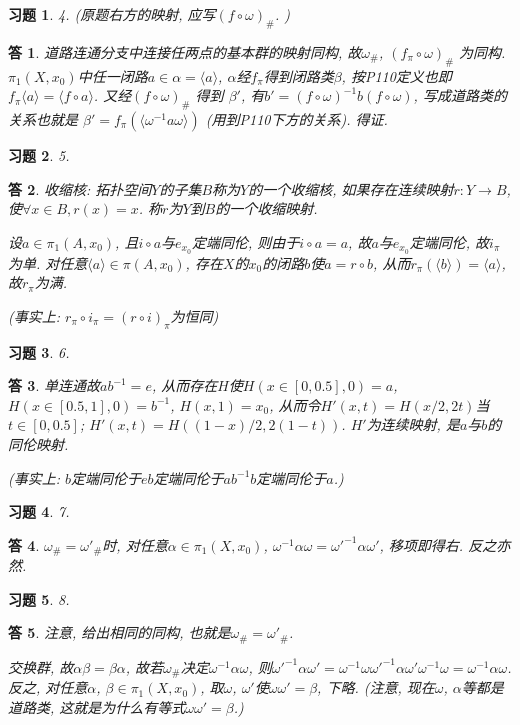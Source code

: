 \documentclass{ctexart}%
\newtheorem*{exercise}{习题}
\newtheorem*{solution}{答}
\theoremstyle{definition}
\theoremstyle{remark}
\begin{document}
\begin{exercise}4. (原题右方的映射, 应写$(f\circ \omega)_\#$. )
\end{exercise}
\begin{solution}
道路连通分支中连接任两点的基本群的映射同构, 故$\omega_\#$, $(f_\pi \circ \omega)_\#$ 为同构. $\pi_1(X,x_0)$中任一闭路$a\in \alpha=\langle a\rangle$, $\alpha$经$f_\pi$得到闭路类$\beta$, 按P110定义也即 $f_\pi\langle a\rangle = \langle f\circ a\rangle$. 又经$(f \circ \omega)_\#$ 得到 $\beta'$, 有$b'= (f \circ \omega)^{-1}b(f \circ \omega)$, 写成道路类的关系也就是
$\beta'=f_\pi(\langle \omega^{-1} a \omega\rangle )$ (用到P110下方的关系). 得证.
\end{solution}

\begin{exercise}5.
\end{exercise}
\begin{solution}
收缩核: 拓扑空间$Y$的子集$B$称为$Y$的一个收缩核, 如果存在连续映射$r:Y\rightarrow B$, 使$\forall x\in B, r(x)=x$. 称$r$为$Y$到$B$的一个收缩映射.

设$a\in \pi_1(A,x_0)$, 且$i\circ a$与$e_{x_0}$定端同伦, 则由于$i\circ a=a$, 故$a$与$e_{x_0}$定端同伦, 故$i_\pi$为单. 对任意$\langle a\rangle \in \pi (A,x_0)$, 存在$X$的$x_0$的闭路$b$使$a=r\circ b$, 从而$r_\pi(\langle b\rangle) = \langle a\rangle$, 故$r_\pi$为满.

(事实上: $r_\pi\circ i_\pi=(r\circ i)_\pi$为恒同)
\end{solution}

\begin{exercise}6.
\end{exercise}
\begin{solution}
单连通故$ab^{-1}=e$, 从而存在$H$使$H(x\in[0,0.5],0)=a$, $H(x\in [0.5,1],0)=b^{-1}$, $H(x,1)=x_0$, 从而令$H'(x,t)=H(x/2,2t)$当$t\in [0,0.5]$; $H'(x,t)=H((1-x)/2, 2(1-t))$. $H'$为连续映射, 是$a$与$b$的同伦映射.

(事实上: $b$定端同伦于$eb$定端同伦于$ab^{-1}b$定端同伦于$a$.)
\end{solution}

\begin{exercise}7.
\end{exercise}
\begin{solution}
$\omega_\#=\omega'_\#$时, 对任意$\alpha \in \pi_1(X,x_0)$, $\omega^{-1}\alpha\omega=\omega'^{-1}\alpha \omega'$, 移项即得右. 反之亦然.
\end{solution}

\begin{exercise}8. 
\end{exercise}
\begin{solution}
注意, 给出相同的同构, 也就是$\omega_\#=\omega'_\#$.

交换群, 故$\alpha \beta= \beta\alpha$, 故若$\omega_\#$决定$\omega^{-1}\alpha\omega$, 则$\omega'^{-1}\alpha\omega'=\omega^{-1}\omega\omega'^{-1}\alpha\omega'\omega^{-1}\omega=
\omega^{-1}\alpha\omega$. 反之, 对任意$\alpha$, $\beta\in \pi_1(X,x_0)$, 取$\omega$, $\omega'$使$\omega\omega'=\beta$, 下略. (注意, 现在$\omega$, $\alpha$等都是道路类, 这就是为什么有等式$\omega\omega'=\beta$.)
\end{solution}
\end{document}
